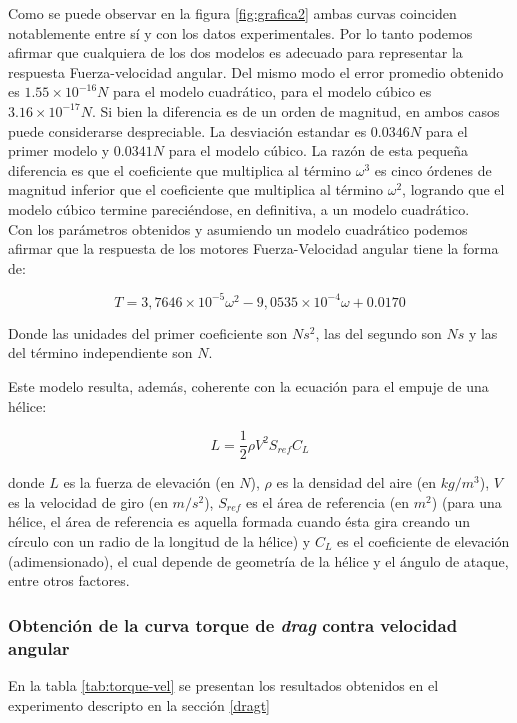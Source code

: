\documentclass[spanish,12pt,a4paper,titlepage]{report}
\begin{document}
Como se puede observar en la figura \ref{fig:grafica2} ambas curvas coinciden notablemente entre sí y con los datos experimentales. Por lo tanto podemos afirmar que cualquiera de los dos modelos es adecuado para representar la respuesta Fuerza-velocidad angular. Del mismo modo el error promedio obtenido es $1.55\times 10^{-16}N$ para el modelo cuadrático, para el modelo cúbico es $3.16\times 10^{-17}N$. Si bien la diferencia es de un orden de magnitud, en ambos casos puede considerarse despreciable. La desviación estandar es $0.0346N$ para el primer modelo y $0.0341N$ para el modelo cúbico. La razón de esta pequeña diferencia es que el coeficiente que multiplica al término $\omega^3$ es cinco órdenes de magnitud inferior que el coeficiente que multiplica al término $\omega^2$, logrando que el modelo cúbico termine pareciéndose, en definitiva, a un modelo cuadrático.\\

Con los parámetros obtenidos y asumiendo un modelo cuadrático podemos afirmar que la respuesta de los motores Fuerza-Velocidad angular tiene la forma de:

\begin{equation}
T=3,7646 \times 10^{-5}\omega ^2 - 9,0535 \times 10^{-4}\omega +0.0170
\end{equation}

Donde las unidades del primer coeficiente son $Ns^2$, las del segundo son $Ns$ y las del término independiente son $N$.

Este modelo resulta, además, coherente con la ecuación para el empuje de una hélice:

\begin{equation}
L=\frac{1}{2}\rho V^2S_{ref}C_L
\end{equation}

donde $L$ es la fuerza de elevación (en $N$), $\rho$ es la densidad del aire (en $kg/m^3$), $V$ es la velocidad de giro (en $m/s^2$), $S_{ref}$ es el área de referencia (en $m^2$) (para  una  hélice,  el  área  de  referencia  es  aquella  formada  cuando ésta gira creando un círculo con un radio de la longitud de la hélice) y $C_L$ es el coeficiente de elevación (adimensionado), el cual depende de geometría de la hélice y el ángulo de ataque, entre otros factores.




\subsubsection{Obtención de la curva torque de \emph{drag} contra velocidad angular}
En la tabla \ref{tab:torque-vel} se presentan los resultados obtenidos en el experimento descripto en la sección \ref{dragt}
\end{document}
